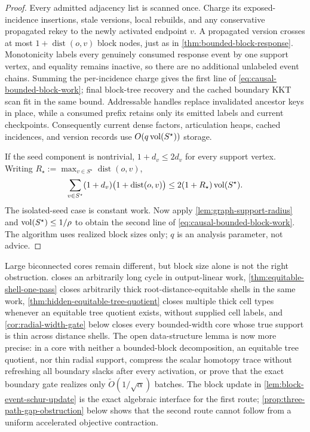 \begin{proof}
Every admitted adjacency list is scanned once.  Charge its exposed-incidence
insertions, stale versions, local rebuilds, and any conservative propagated
rekey to the newly activated endpoint $v$.  A propagated version crosses at
most $1+\operatorname{dist}(o,v)$ block nodes, just as in
\cref{thm:bounded-block-response}.  Monotonicity labels every genuinely
consumed response event by one support vertex, and equality remains inactive,
so there are no additional unlabeled event chains.  Summing the per-incidence
charge gives the first line of \cref{eq:causal-bounded-block-work}; final
block-tree recovery and the cached boundary KKT scan fit in the same bound.
Addressable handles replace invalidated ancestor keys in place, while a
consumed prefix retains only its emitted labels and current checkpoints.
Consequently current dense factors, articulation heaps, cached incidences,
and version records use $O(q\operatorname{vol}(S^\star))$ storage.

If the seed component is nontrivial, $1+d_v\leq2d_v$ for every support
vertex.  Writing $R_\star:=\max_{v\in S^\star}\operatorname{dist}(o,v)$,
\begin{equation*}
 \sum_{v\in S^\star}(1+d_v)
       \bigl(1+\operatorname{dist}(o,v)\bigr)
 \leq2(1+R_\star)\operatorname{vol}(S^\star).
\end{equation*}
The isolated-seed case is constant work.  Now apply
\cref{lem:graph-support-radius} and
$\operatorname{vol}(S^\star)\leq1/\rho$ to obtain the second line of
\cref{eq:causal-bounded-block-work}.  The algorithm uses realized block sizes
only; $q$ is an analysis parameter, not advice.
\end{proof}

Large biconnected cores remain different, but block size alone is not the
right obstruction.   closes an arbitrarily long
cycle in output-linear work, \cref{thm:equitable-shell-one-pass} closes
arbitrarily thick root-distance-equitable shells in the same work,
\cref{thm:hidden-equitable-tree-quotient} closes multiple thick cell types
whenever an equitable tree quotient exists, without supplied cell labels, and
\cref{cor:radial-width-gate} below closes every bounded-width core whose true
support is thin across distance shells.  The open data-structure lemma is now
more precise: in a core with neither a bounded-block decomposition, an
equitable tree quotient, nor thin radial support, compress the scalar homotopy
trace without refreshing all boundary slacks after every activation, or prove
that the exact boundary gate realizes only
$\widetilde O(1/\sqrt\alpha)$ batches.  The block update in
\cref{lem:block-event-schur-update} is the exact algebraic interface for the
first route; \cref{prop:three-path-gap-obstruction} below shows that the second
route cannot follow from a uniform accelerated objective contraction.
